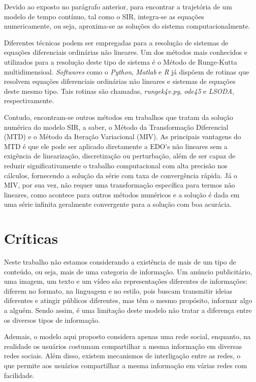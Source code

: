\documentclass[
	12pt,				%
	openright,			%
	oneside,			%
	a4paper,			%
	english,			%
	french,				%
	spanish,			%
	brazil				%
	]{abntex2}
\begin{document}
Devido ao exposto no parágrafo anterior, para encontrar a trajetória
de um modelo de tempo contínuo, tal como o SIR, integra-se as equações
numericamente, ou seja, aproxima-se as soluções do sistema
computacionalmente.

Diferentes técnicas podem ser empregadas para a resolução de sistemas
de equações diferenciais ordinárias não lineares. Um dos métodos mais
conhecidos e utilizados para a resolução deste tipo de sistema é o
Método de Runge-Kutta multidimensioal. \emph{Softwares} como o
\emph{Python}, \emph{Matlab} e \emph{R} já dispõem de rotinas que
resolvem equações diferenciais ordinárias não lineares e sistemas de
equações deste mesmo tipo. Tais rotinas são chamadas,
\emph{rungek4v.py}, \emph{ode45} e \emph{LSODA}, respectivamente.

Contudo, encontram-se outros métodos em trabalhos que tratam da
solução numérica do modelo SIR, a saber, o Método da Transformação
Diferencial (MTD) e o Método da Iteração Variacional (MIV). As
principais vantagens do MTD é que ele pode ser aplicado diretamente a
EDO's não lineares sem a exigência de linearização, discretização ou
perturbação, além de ser capaz de reduzir significativamente o
trabalho computacional com alta precisão nos cálculos, fornecendo a
solução da série com taxa de convergência rápida. Já o MIV, por sua
vez, não requer uma transformação específica para termos não lineares,
como acontece para outros métodos numéricos e a solução é dada em uma
série infinita geralmente convergente para a solução com boa
acurácia\cite{akinboro2014}.


\chapter{Críticas}
Neste trabalho não estamos considerando a existência de mais de um
tipo de conteúdo, ou seja, mais de uma categoria de informação.  Um
anúncio publicitário, uma imagem, um texto e um vídeo são
representações diferentes de informações: diferem no formato, na
linguagem e no estilo, pois buscam transmitir ideias diferentes e
atingir públicos diferentes, mas têm o mesmo propósito, informar algo
a alguém.  Sendo assim, é uma limitação deste modelo não tratar a
diferença entre os diversos tipos de informação.

Ademais, o modelo aqui proposto considera apenas uma rede social,
enquanto, na realidade os usuários costumam compartilhar a mesma
informação em diversas redes sociais.  Além disso, existem mecanismos
de interligação entre as redes, o que permite aos usuários
compartilhar a mesma informação em várias redes com facilidade.
\end{document}
